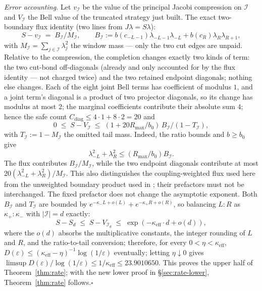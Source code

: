 \documentclass[11pt]{article}
\theoremstyle{remark}
\newcommand{\keff}{\kappa_{\mathrm{eff}}}
\newcommand{\eps}{\varepsilon}
\begin{document}
\emph{Error accounting.} Let $v_{\mathcal{I}}$ be the value of the principal Jacobi
compression on $\mathcal{I}$ and $V_{\mathcal{I}}$ the Bell value of the truncated strategy
just built. The exact two-boundary flux identity (two lines from
$J\lambda=S\lambda$):
\[
S-v_{\mathcal{I}} \;=\; B_{\mathcal{I}}/M_{\mathcal{I}},\qquad
B_{\mathcal{I}} := b(c_{-L-1})\lambda_{-L-1}\lambda_{-L}
+ b(c_R)\lambda_R\lambda_{R+1},
\]
with $M_{\mathcal{I}}=\sum_{j\in\mathcal{I}}\lambda_j^2$ the window mass --- only the two cut
edges are unpaid. Relative to the compression, the completion changes
exactly two kinds of term: the two cut-bond off-diagonals (already and
only accounted for by the flux identity --- not charged twice) and the two
retained endpoint diagonals; nothing else changes. Each of the eight joint
Bell terms has coefficient of modulus $1$, and a joint term's diagonal is
a product of two projector diagonals, so its change has modulus at most
$2$; the marginal coefficients contribute their absolute sum $4$; hence
the safe count $C_{\mathrm{diag}}\le 4\cdot1+8\cdot2=20$ and
\[
0 \;\le\; S-V_{\mathcal{I}} \;\le\; (1+20R_{\max}/b_0)\,
B_{\mathcal{I}}/(1-T_{\mathcal{I}}),
\]
with $T_{\mathcal{I}}:=1-M_{\mathcal{I}}$ the omitted tail mass.
Indeed, the ratio bounds and $b\ge b_0$ give
\[
\lambda_{-L}^2+\lambda_R^2\le (R_{\max}/b_0)B_{\mathcal{I}}.
\]
The flux contributes $B_{\mathcal{I}}/M_{\mathcal{I}}$, while the two
endpoint diagonals contribute at most
$20(\lambda_{-L}^2+\lambda_R^2)/M_{\mathcal{I}}$.
This also distinguishes the coupling-weighted flux used here from the
unweighted boundary product used in \cite{RUB26}; their prefactors must
not be interchanged. The fixed prefactor does not change the asymptotic
exponent. Both $B_{\mathcal{I}}$ and $T_{\mathcal{I}}$ are bounded by
$e^{-\kappa_-L+o(L)}+e^{-\kappa_+R+o(R)}$, so
balancing $L:R$ as $\kappa_+:\kappa_-$ with $|\mathcal{I}|=d$ exactly:
\begin{equation}\label{eq:ub}
S-S_d \;\le\; S-V_{\mathcal{I}_d} \;\le\; \exp(-\keff\cdot d + o(d)),
\end{equation}
where the $o(d)$ absorbs the multiplicative constants, the integer
rounding of $L$ and $R$, and the ratio-to-tail conversion; therefore, for
every $0<\eta<\keff$,
$D(\eps)\le(\keff-\eta)^{-1}\log(1/\eps)$ eventually; letting
$\eta\downarrow0$ gives
$\limsup D(\eps)/\log(1/\eps)\le 1/\keff\le 23.9010650$. This proves
the upper half of Theorem~\ref{thm:rate}; with the new lower proof in
\S\ref{sec:rate-lower},
Theorem~\ref{thm:rate} follows.\hfill$\square$
\end{document}
